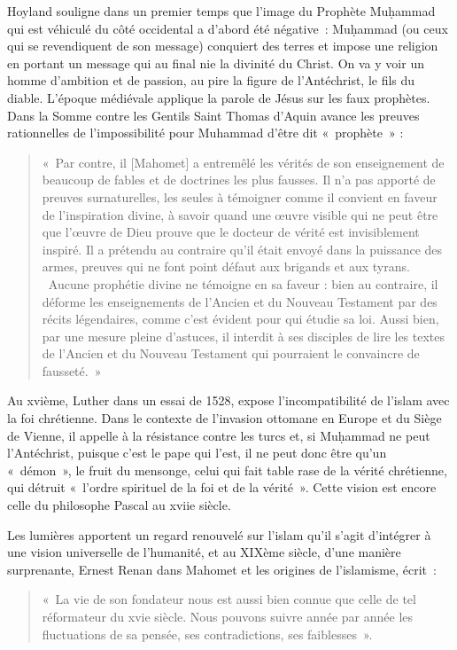 Hoyland souligne dans un premier temps que l'image du Prophète Muḥammad
qui est véhiculé du côté occidental a d'abord été négative~: Muḥammad
(ou ceux qui se revendiquent de son message) conquiert des terres et
impose une religion en portant un message qui au final nie la divinité
du Christ. On va y voir un homme d'ambition et de passion, au pire la
figure de l'Antéchrist, le fils du diable. L'époque médiévale applique
la parole de Jésus sur les faux prophètes. Dans la {Somme contre
les Gentils} Saint Thomas d'Aquin avance les preuves rationnelles de
l'impossibilité pour Muhammad d'être dit «~prophète~» :
\begin{quote}
    «~Par
  contre, il {[}Mahomet{]} a entremêlé les vérités de son enseignement
  de beaucoup de fables et de doctrines les plus fausses. Il n'a pas
  apporté de preuves surnaturelles, les seules à témoigner comme il
  convient en faveur de l'inspiration divine, à savoir quand une œuvre
  visible qui ne peut être que l'œuvre de Dieu prouve que le docteur de
  vérité est invisiblement inspiré. Il a prétendu au contraire qu'il
  était envoyé dans la puissance des armes, preuves qui ne font point
  défaut aux brigands et aux tyrans. ~Aucune prophétie divine ne
  témoigne en sa faveur : bien au contraire, il déforme les
  enseignements de l'Ancien et du Nouveau Testament par des récits
  légendaires, comme c'est évident pour qui étudie sa loi. Aussi bien,
  par une mesure pleine d'astuces, il interdit à ses disciples de lire
  les textes de l'Ancien et du Nouveau Testament qui pourraient le
  convaincre de fausseté.~»
\end{quote}
Au xvième, Luther dans un essai de 1528,
expose l'incompatibilité de l'islam avec la foi chrétienne. Dans le
contexte de l'invasion ottomane en Europe et du Siège de Vienne, il
appelle à la résistance contre les turcs et, si Muḥammad ne peut
l'Antéchrist, puisque c'est le pape qui l'est, il ne peut donc être
qu'un «~démon~», le fruit du mensonge, celui qui fait table rase de la
vérité chrétienne, qui détruit «~l'ordre spirituel de la foi et de la
vérité~». Cette vision est
encore celle du philosophe Pascal au xviie siècle.

Les lumières apportent un regard renouvelé sur l'islam qu'il s'agit
d'intégrer à une vision universelle de l'humanité, et au XIXème siècle,
d'une manière surprenante, Ernest Renan dans {Mahomet et les
origines de l'islamisme}, écrit~:
\begin{quote}
    «~La vie de son fondateur nous est aussi bien connue que celle de tel
réformateur du xvie siècle. Nous pouvons suivre année par année les
fluctuations de sa pensée, ses contradictions, ses faiblesses~».
\end{quote}


